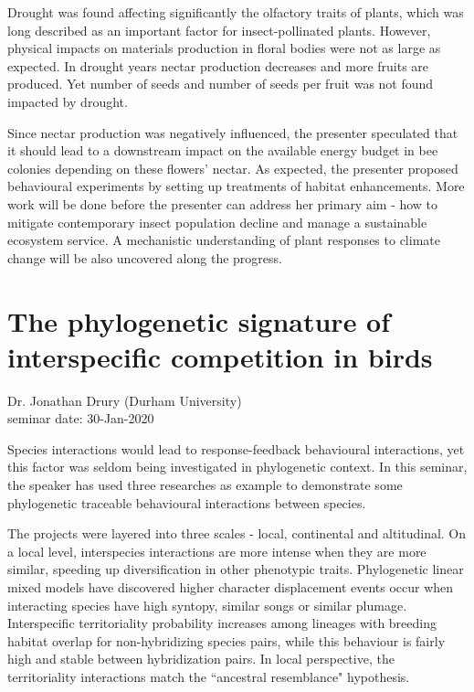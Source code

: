 \documentclass{article}
\begin{document}
    Drought was found affecting significantly the olfactory traits of plants, which was long described as an important factor for insect-pollinated plants.  However, physical impacts on materials production in floral bodies were not as large as expected.  In drought years nectar production decreases and more fruits are produced.  Yet number of seeds and number of seeds per fruit was not found impacted by drought.
    
    Since nectar production was negatively influenced, the presenter speculated that it should lead to a downstream impact on the available energy budget in bee colonies depending on these flowers' nectar.  As expected, the presenter proposed behavioural experiments by setting up treatments of habitat enhancements.  More work will be done before the presenter can address her primary aim - how to mitigate contemporary insect population decline and manage a sustainable ecosystem service.  A mechanistic understanding of plant responses to climate change will be also uncovered along the progress.
    \clearpage
    
    \section{The phylogenetic signature of interspecific competition in birds}
    \begin{flushright}
        \large{Dr. Jonathan Drury (Durham University)}\\
        seminar date: 30-Jan-2020
    \end{flushright}
    Species interactions would lead to response-feedback behavioural interactions, yet this factor was seldom being investigated in phylogenetic context.  In this seminar, the speaker has used three researches as example to demonstrate some phylogenetic traceable behavioural interactions between species.
    
    The projects were layered into three scales - local, continental and altitudinal.  On a local level, interspecies interactions are more intense when they are more similar, speeding up diversification in other phenotypic traits.  Phylogenetic linear mixed models have discovered higher character displacement events occur when interacting species have high syntopy, similar songs or similar plumage.  Interspecific territoriality probability increases among lineages with breeding habitat overlap for non-hybridizing species pairs, while this behaviour is fairly high and stable between hybridization pairs.  In local perspective, the territoriality interactions match the ``ancestral resemblance" hypothesis.
    
\end{document}
